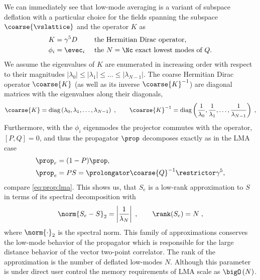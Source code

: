 We can immediately see that low-mode averaging is a variant of subspace deflation with a particular choice for the fields spanning the subspace $\coarse{\vslattice}$ and the operator $K$ as
\begin{align}
K &= \gamma^{5} D  &  &\text{ the Hermitian Dirac operator,} \\
\phi_i &= \evec_i  &  &\text{ the $N=\Nc$ exact lowest modes of $Q$.}
\end{align}
We assume the eigenvalues of $K$ are enumerated in increasing order with respect to their magnitudes $\lvert \lambda_0 \rvert \leq \lvert \lambda_1 \rvert \leq \ldots \leq \lvert \lambda_{N-1} \rvert$.
The coarse Hermitian Dirac operator $\coarse{K}$ (as well as its inverse $\coarse{K}^{-1}$) are diagonal matrices with the eigenvalues along their diagonals,
\begin{equation} \label{eq:sd:lma:diagonal:dirac}
\coarse{K} = \text{diag}\left(\lambda_0, \lambda_1, \ldots, \lambda_{N-1}\right) \;,
\qquad
\coarse{K}^{-1} = \text{diag}\left(\frac{1}{\lambda_0}, \frac{1}{\lambda_1}, \ldots, \frac{1}{\lambda_{N-1}}\right) \;,
\end{equation}
Furthermore, with the $\phi_i$ eigenmodes the projector commutes with the operator, $[P,Q]=0$, and thus the propagator $\prop$ decomposes exactly as in the LMA case
\begin{align}
\prop_{r} &= (1-P) \prop, \\
\prop_{e} &= PS = \prolongator \coarse{Q}^{-1} \restrictor \gamma^5,
\end{align}
compare \cref{eq:prop:lma}.
This shows us, that $S_e$ is a low-rank approximation to $S$ in terms of its spectral decomposition with
\begin{equation}
\norm{S_e - S}_2
 = \left\lvert \frac{1}{\lambda_{N}} \right\rvert \;,
\qquad
\rank(S_e) = N \;,
\end{equation}
where $\norm{\cdot}_2$ is the spectral norm.
This family of approximations conserves the low-mode behavior of the propagator which is responsible for the large distance behavior of the vector two-point correlator.
The rank of the approximation is the number of deflated low-modes $N$.
Although this parameter is under direct user control the memory requirements of LMA scale as $\bigO\left( N \right)$.

